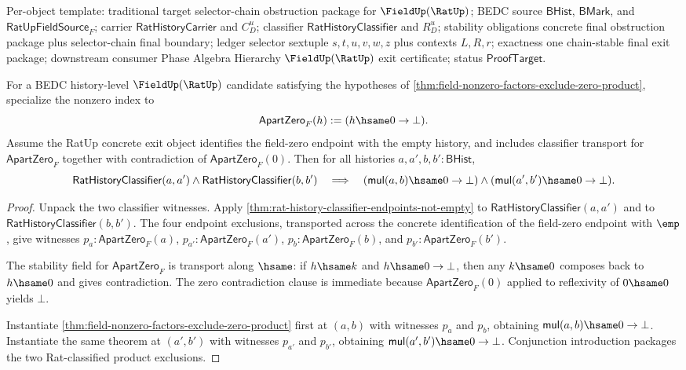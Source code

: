 Per-object template: traditional target selector-chain obstruction package for
$\FieldUp(\RatUp)$; BEDC source $\mathsf{BHist}$, $\mathsf{BMark}$, and
$\mathsf{RatUpFieldSource}_F$; carrier $\mathsf{RatHistoryCarrier}$ and
$C_D^u$; classifier $\mathsf{RatHistoryClassifier}$ and $R_D^u$; stability
obligations concrete final obstruction package plus selector-chain final
boundary; ledger selector sextuple $s,t,u,v,w,z$ plus contexts $L,R,r$;
exactness one chain-stable final exit package; downstream consumer Phase Algebra
Hierarchy $\FieldUp(\RatUp)$ exit certificate; status $\mathsf{ProofTarget}$.

\begin{theorem}
\label{thm:ratup-fieldup-rat-classified-factors-exclude-empty-product}
For a BEDC history-level $\FieldUp(\RatUp)$ candidate satisfying the hypotheses
of \autoref{thm:field-nonzero-factors-exclude-zero-product}, specialize the
nonzero index to
$$
\mathsf{ApartZero}_F(h):=(h\hsame0\to\bot).
$$
Assume the RatUp concrete exit object identifies the field-zero endpoint with
the empty history, and includes classifier transport for
$\mathsf{ApartZero}_F$ together with contradiction of
$\mathsf{ApartZero}_F(0)$. Then for all histories
$a,a',b,b':\mathsf{BHist}$,
$$
\mathsf{RatHistoryClassifier}(a,a')
\land
\mathsf{RatHistoryClassifier}(b,b')
\quad\Longrightarrow\quad
(\mathsf{mul}(a,b)\hsame0\to\bot)
\land
(\mathsf{mul}(a',b')\hsame0\to\bot).
$$
\end{theorem}
\begin{proof}
Unpack the two classifier witnesses. Apply
\autoref{thm:rat-history-classifier-endpoints-not-empty} to
$\mathsf{RatHistoryClassifier}(a,a')$ and to
$\mathsf{RatHistoryClassifier}(b,b')$. The four endpoint exclusions, transported
across the concrete identification of the field-zero endpoint with $\emp$,
give witnesses
$p_a:\mathsf{ApartZero}_F(a)$, $p_{a'}:\mathsf{ApartZero}_F(a')$,
$p_b:\mathsf{ApartZero}_F(b)$, and $p_{b'}:\mathsf{ApartZero}_F(b')$.

The stability field for $\mathsf{ApartZero}_F$ is transport along $\hsame$:
if $h\hsame k$ and $h\hsame0\to\bot$, then any $k\hsame0$ composes back to
$h\hsame0$ and gives contradiction. The zero contradiction clause is immediate
because $\mathsf{ApartZero}_F(0)$ applied to reflexivity of $0\hsame0$ yields
$\bot$.

Instantiate \autoref{thm:field-nonzero-factors-exclude-zero-product} first at
$(a,b)$ with witnesses $p_a$ and $p_b$, obtaining
$\mathsf{mul}(a,b)\hsame0\to\bot$. Instantiate the same theorem at
$(a',b')$ with witnesses $p_{a'}$ and $p_{b'}$, obtaining
$\mathsf{mul}(a',b')\hsame0\to\bot$. Conjunction introduction packages the two
Rat-classified product exclusions.
\end{proof}

